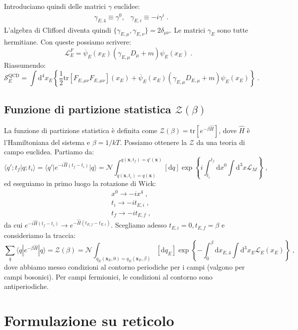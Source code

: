 \documentclass[12pt,a4paper]{article}
\theoremstyle{definition}
\newcommand{\lag}{\mathcal{L}}
\newcommand{\diff}[1][]{\mathrm{d}#1}
\newcommand{\bra}{\langle}
\newcommand{\ket}{\rangle}
\newcommand{\tr}{\mathrm{tr}}
\newcommand{\zpart}{\mathcal{Z}}
\numberwithin{equation}{section}
\begin{document}
Introduciamo quindi delle matrici $\gamma$ euclidee:
\begin{align}
&\gamma_{E,4}\equiv\gamma^0, &\gamma_{E,i}\equiv -i\gamma^i\;.
\end{align}
L'algebra di Clifford diventa quindi $\{\gamma_{E,\mu},\gamma_{E,\nu}\}=2\delta_{\mu\nu}$. Le matrici $\gamma_E$ sono tutte hermitiane. Con queste possiamo scrivere:
\begin{equation}
\lag_E^F=\overline{\psi}_E(x_E)(\gamma_{E,\mu}D_{\mu}+m)\psi_E(x_E)\;.
\end{equation}
Riassumendo:
\begin{equation}
\mathcal{S}_E^{\mathrm{QCD}}=\int\diff^4{x_E}\left\{\frac{1}{2}\tr[F_{E,\mu\nu}F_{E,\mu\nu}](x_E)+\overline{\psi}_E(x_E)(\gamma_{E,\mu}D_{E,\mu}+m)\psi_E(x_E)\right\}\;.
\end{equation}
\subsection{Funzione di partizione statistica $\zpart(\beta)$}
La funzione di partizione statistica è definita come $\zpart(\beta)=\tr[e^{-\beta\hat{H}}]$, dove $\hat{H}$ è l'Hamiltoniana del sistema e $\beta=1/kT$. Possiamo ottenere la $\zpart$ da una teoria di campo euclidea. Partiamo da:
\begin{equation}
\bra q';t_f|q;t_i\ket=\bra q'|e^{-i\hat{H}(t_f-t_i)}|q\ket=\mathcal{N}\int_{q(\mathbf{x},t_i)=q(\mathbf{x})}^{q(\mathbf{x},t_f)=q'(\mathbf{x})} [\diff{q}]\exp\left\{i\int_{t_i}^{t_f}\diff{x^0}\int\diff^3{x}\lag_M\right\}\;,
\end{equation}
ed eseguiamo in primo luogo la rotazione di Wick:
\begin{align*}
& x^0\longrightarrow -ix^4\;, \\
& t_i\longrightarrow -it_{E,i}\;, \\
& t_f\longrightarrow -it_{E,f}\;,
\end{align*}
da cui $e^{-i\hat{H}(t_f-t_i)}\longrightarrow e^{-\hat{H}(t_{E,f}-t_{E,i})}$. Scegliamo adesso $t_{E,i}=0,t_{E,f}=\beta$ e consideriamo la traccia:
$$
\sum_q\bra q|e^{-\beta\hat{H}}|q\ket=\zpart(\beta)=\mathcal{N}\int_{q_E(\mathbf{x}_E,0)=q_E(\mathbf{x}_E,\beta)}[\diff{q_E}]\exp\left\{-\int_0^{\beta}\diff{x_{E,4}}\int\diff^3{x_E}\lag_E(x_E)\right\}\;,
$$
dove abbiamo messo condizioni al contorno periodiche per i campi (valgono per campi bosonici). Per campi fermionici, le condizioni al contorno sono antiperiodiche.
\cleardoublepage
\section{Formulazione su reticolo}
\end{document}
